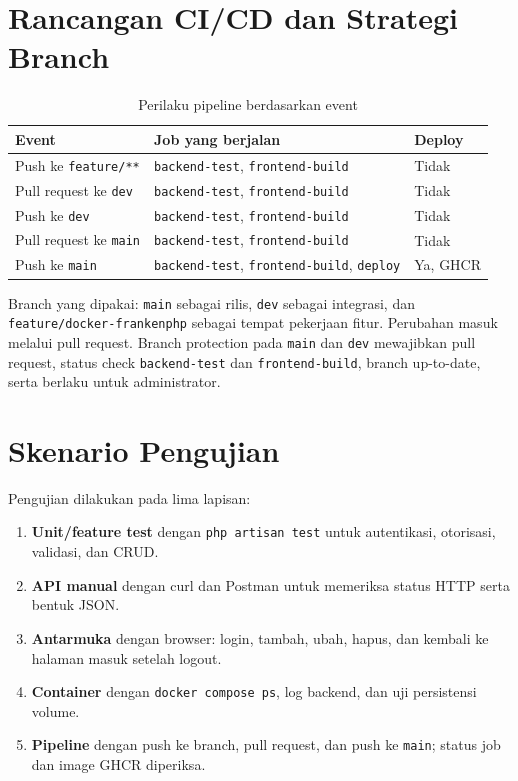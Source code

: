 \documentclass[12pt,a4paper,oneside]{book}
\begin{document}
\section{Rancangan CI/CD dan Strategi Branch}

\begin{table}[H]
\centering
\caption{Perilaku pipeline berdasarkan event}
\label{tab:pipeline}
\begin{tabularx}{\textwidth}{@{}l l X@{}}
\toprule
\textbf{Event} & \textbf{Job yang berjalan} & \textbf{Deploy} \\
\midrule
Push ke \texttt{feature/**} & \texttt{backend-test}, \texttt{frontend-build} & Tidak \\
Pull request ke \texttt{dev} & \texttt{backend-test}, \texttt{frontend-build} & Tidak \\
Push ke \texttt{dev} & \texttt{backend-test}, \texttt{frontend-build} & Tidak \\
Pull request ke \texttt{main} & \texttt{backend-test}, \texttt{frontend-build} & Tidak \\
Push ke \texttt{main} & \texttt{backend-test}, \texttt{frontend-build}, \texttt{deploy} & Ya, GHCR \\
\bottomrule
\end{tabularx}
\end{table}

Branch yang dipakai: \texttt{main} sebagai rilis, \texttt{dev} sebagai integrasi,
dan \texttt{feature/docker-frankenphp} sebagai tempat pekerjaan fitur. Perubahan
masuk melalui pull request. Branch protection pada \texttt{main} dan \texttt{dev}
mewajibkan pull request, status check \texttt{backend-test} dan
\texttt{frontend-build}, branch up-to-date, serta berlaku untuk administrator.

\section{Skenario Pengujian}

Pengujian dilakukan pada lima lapisan:

\begin{enumerate}[leftmargin=1.2cm]
  \item \textbf{Unit/feature test} dengan \texttt{php artisan test} untuk autentikasi,
        otorisasi, validasi, dan CRUD.
  \item \textbf{API manual} dengan curl dan Postman untuk memeriksa status HTTP
        serta bentuk JSON.
  \item \textbf{Antarmuka} dengan browser: login, tambah, ubah, hapus, dan kembali
        ke halaman masuk setelah logout.
  \item \textbf{Container} dengan \texttt{docker compose ps}, log backend, dan uji
        persistensi volume.
  \item \textbf{Pipeline} dengan push ke branch, pull request, dan push ke
        \texttt{main}; status job dan image GHCR diperiksa.
\end{enumerate}
\end{document}
